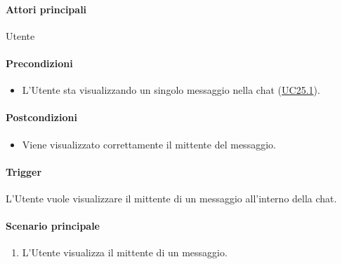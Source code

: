 \paragraph*{Attori principali}
Utente

\paragraph*{Precondizioni}
\begin{itemize}
  \item L'Utente sta visualizzando un singolo messaggio nella chat (\hyperref[UC25point1]{UC25.1}).
\end{itemize}

\paragraph*{Postcondizioni}
\begin{itemize}
  \item Viene visualizzato correttamente il mittente del messaggio.
\end{itemize}

\paragraph*{Trigger}
L'Utente vuole visualizzare il mittente di un messaggio all'interno della chat.

\paragraph*{Scenario principale}
\begin{enumerate}
  \item L'Utente visualizza il mittente di un messaggio.
\end{enumerate}